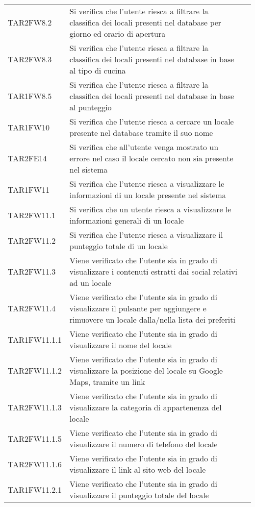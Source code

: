 \begin{longtable}{ m{}<{\centering}  m{}<{\centering}  m{}<{\centering} }
	TAR2FW8.2 & Si verifica che l'utente riesca a filtrare la classifica dei locali presenti nel database per giorno ed orario di apertura & \Su \\
	TAR2FW8.3 & Si verifica che l'utente riesca a filtrare la classifica dei locali presenti nel database in base al tipo di cucina & \Su \\
	TAR1FW8.5 & Si verifica che l'utente riesca a filtrare la classifica dei locali presenti nel database in base al punteggio & \Su \\
	TAR1FW10 & Si verifica che l'utente riesca a cercare un locale presente nel database tramite il suo nome & \Su \\
	TAR2FE14 & Si verifica che all'utente venga mostrato un errore nel caso il locale cercato non sia presente nel sistema & \Su \\
	TAR1FW11 & Si verifica che l'utente riesca a visualizzare le informazioni di un locale presente nel sistema & \Su \\
	TAR2FW11.1 & Si verifica che un utente riesca a visualizzare le informazioni generali di un locale & \Su \\
	TAR2FW11.2 & Si verifica che l'utente riesca a visualizzare il punteggio totale di un locale & \Su \\
	TAR2FW11.3 & Viene verificato che l'utente sia in grado di visualizzare i contenuti estratti dai social relativi ad un locale & \Su \\
	TAR2FW11.4 & Viene verificato che l'utente sia in grado di visualizzare il pulsante per aggiungere e rimuovere un locale dalla/nella lista dei preferiti & \Su \\
	TAR1FW11.1.1 &	Viene verificato che l'utente sia in grado di visualizzare il nome del locale & \Su \\
	TAR2FW11.1.2 & Viene verificato che l'utente sia in grado di visualizzare la posizione del locale su Google Maps, tramite un link & \Su \\
	TAR2FW11.1.3	& Viene verificato che l'utente sia in grado di visualizzare la categoria di appartenenza del locale & \Su \\
	TAR2FW11.1.5	& Viene verificato che l'utente sia in grado di visualizzare il numero di telefono del locale & \Su \\
	TAR2FW11.1.6	& Viene verificato che l'utente sia in grado di visualizzare il link al sito web del locale & \Su \\
	TAR1FW11.2.1	& Viene verificato che l'utente sia in grado di visualizzare il punteggio totale del locale & \Su \\

\end{longtable}
